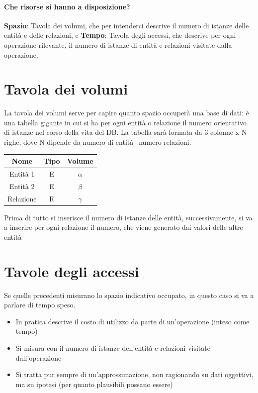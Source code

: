 \documentclass[12pt, a4paper, openany, twoside]{book}
\begin{document}
\paragraph{Che risorse si hanno a disposizione?} \textbf{Spazio}: Tavola dei volumi, che
per intenderci descrive il numero di istanze delle entità e delle relazioni, e
\textbf{Tempo}: Tavola degli accessi, che descrive per ogni operazione rilevante, 
il numero di istanze di entità e relazioni visitate dalla operazione.
\section{Tavola dei volumi}
La tavola dei volumi serve per capire quanto spazio occuperà una base di dati: 
è una tabella gigante in cui si ha per ogni entità o relazione il numero orientativo
di istanze nel corso della vita del DB. La tabella sarà formata da 3 colonne x N
righe, dove N dipende da numero di entità+numero relazioni.
\begin{center}
\begin{tabular}{ |c|c|c| } 
 \hline
 Nome & Tipo & Volume \\
 \hline
 Entità 1 & E & $\alpha$ \\ 
 Entità 2 & E & $\beta$ \\ 
 Relazione & R & $\gamma$ \\ 
 \hline
\end{tabular}
\end{center}
Prima di tutto si inserisce il numero di istanze delle entità, successivamente,
si va a inserire per ogni relazione il numero, che viene generato dai valori
delle altre entità
\section{Tavole degli accessi}
Se quelle precedenti misurano lo spazio indicativo occupato, in questo caso si 
va a parlare di tempo speso.
\begin{itemize}
	\item In pratica descrive il costo di utilizzo da parte di un'operazione
	(inteso come tempo)
	\item Si misura con il numero di istanze dell'entità e relazioni visitate 
	dall'operazione
	\item Si tratta pur sempre di un'approssimazione, non ragionando su dati
	oggettivi, ma su ipotesi (per quanto plausibili possano essere)
\end{itemize}
\end{document}
